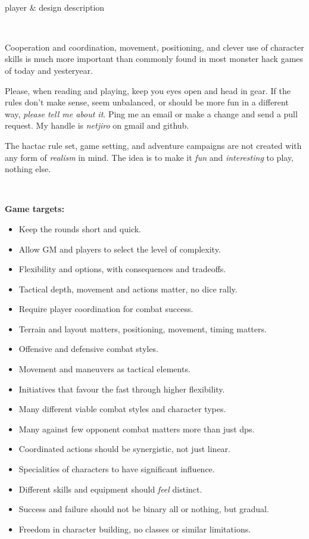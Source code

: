 \

\todo  player \& design description

\

Cooperation and coordination, movement, positioning, and clever use of character skills is much more important than commonly found in most monster hack games of today and yesteryear.

Please, when reading and playing, keep you eyes open and head in gear. If the rules don't make sense, seem unbalanced, or should be more fun in a different way, \emph{please tell me about it}. Ping me an email or make a change and send a pull request. My handle is \emph{netjiro} on gmail and github.

The hactac rule set, game setting, and adventure campaigns are not created with any form of \emph{realism} in mind. The idea is to make it \emph{fun} and \emph{interesting} to play, nothing else.

\

\textbf{Game targets:}
\begin{itemize}
    \item Keep the rounds short and quick.
    \item Allow GM and players to select the level of complexity.
    \item Flexibility and options, with consequences and tradeoffs.
    \item Tactical depth, movement and actions matter, no dice rally.
    \item Require player coordination for combat success.
    \item Terrain and layout matters, positioning, movement, timing matters.
    \item Offensive and defensive combat styles.
    \item Movement and maneuvers as tactical elements.
    \item Initiatives that favour the fast through higher flexibility.
    \item Many different viable combat styles and character types.
    \item Many against few opponent combat matters more than just dps.
    \item Coordinated actions should be synergistic, not just linear.
    \item Specialities of characters to have significant influence.
    \item Different skills and equipment should \emph{feel} distinct.
    \item Success and failure should not be binary all or nothing, but gradual.
    \item Freedom in character building, no classes or similar limitations.
\end{itemize}

